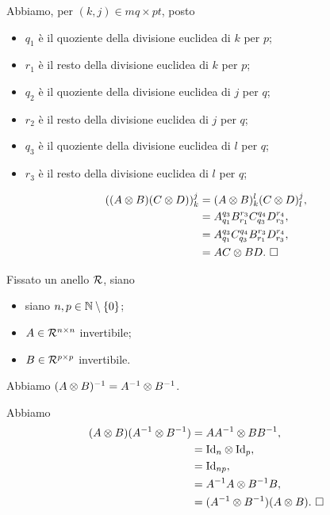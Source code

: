 \Proof Abbiamo, per $(k,j) \in mq \times pt$,
posto
\begin{itemize}
    \item $q_1$ \`e il quoziente della divisione euclidea di $k$ per $p$;
    \item $r_1$ \`e il resto della divisione euclidea di $k$ per $p$;
    \item $q_2$ \`e il quoziente della divisione euclidea di $j$ per $q$;
    \item $r_2$ \`e il resto della divisione euclidea di $j$ per $q$;
    \item $q_3$ \`e il quoziente della divisione euclidea di $l$ per $q$;
    \item $r_3$ \`e il resto della divisione euclidea di $l$ per $q$;
\end{itemize}
\begin{align*}
  ((A \otimes B)(C \otimes D))_k^j
  &= (A \otimes B)_k^l (C \otimes D)_l^j,\\
  &= A_{q_1}^{q_3} B_{r_1}^{r_3} C_{q_3}^{q_4} D_{r_3}^{r_4},\\
  &= A_{q_1}^{q_3} C_{q_3}^{q_4} B_{r_1}^{r_3} D_{r_3}^{r_4},\\
  &= AC \otimes BD.\text{ $\square$}
\end{align*}
\begin{Corollary}
  Fissato un anello $\mathcal{R}$, siano
  \begin{itemize}
    \item siano $n, p \in \mathbb{N} \setminus \lbrace 0 \rbrace$;
    \item $A \in \mathcal{R}^{n \times n}$ invertibile;
    \item $B \in \mathcal{R}^{p \times p}$ invertibile.
  \end{itemize}
  Abbiamo $(A \otimes B)^{-1} = A^{-1} \otimes B^{-1}$.
\end{Corollary}
\Proof Abbiamo
\begin{align*}
  (A \KroneckerProduct B)(A^{-1} \KroneckerProduct B^{-1})
  &= AA^{-1} \KroneckerProduct BB^{-1},\\
  &= \Identity_n \KroneckerProduct \Identity_p,\\
  &= \Identity_{np},\\
  &= A^{-1}A \KroneckerProduct B^{-1}B,\\
  &= (A^{-1} \KroneckerProduct B^{-1})(A \KroneckerProduct B).\text{ \EndProof}
\end{align*}
